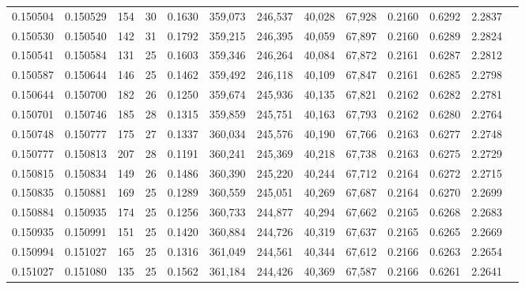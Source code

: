 \begin{tabular}{rrrrrrrrrrrrr}
0.150504 & 0.150529 & 154 &  30 &                                     0.1630 & 359,073 & 246,537 &  40,028 &  67,928 & 0.2160 & 0.6292 & 2.2837 \\
0.150530 & 0.150540 & 142 &  31 &                                     0.1792 & 359,215 & 246,395 &  40,059 &  67,897 & 0.2160 & 0.6289 & 2.2824 \\
0.150541 & 0.150584 & 131 &  25 &                                     0.1603 & 359,346 & 246,264 &  40,084 &  67,872 & 0.2161 & 0.6287 & 2.2812 \\
0.150587 & 0.150644 & 146 &  25 &                                     0.1462 & 359,492 & 246,118 &  40,109 &  67,847 & 0.2161 & 0.6285 & 2.2798 \\
0.150644 & 0.150700 & 182 &  26 &                                     0.1250 & 359,674 & 245,936 &  40,135 &  67,821 & 0.2162 & 0.6282 & 2.2781 \\
0.150701 & 0.150746 & 185 &  28 &                                     0.1315 & 359,859 & 245,751 &  40,163 &  67,793 & 0.2162 & 0.6280 & 2.2764 \\
0.150748 & 0.150777 & 175 &  27 &                                     0.1337 & 360,034 & 245,576 &  40,190 &  67,766 & 0.2163 & 0.6277 & 2.2748 \\
0.150777 & 0.150813 & 207 &  28 &                                     0.1191 & 360,241 & 245,369 &  40,218 &  67,738 & 0.2163 & 0.6275 & 2.2729 \\
0.150815 & 0.150834 & 149 &  26 &                                     0.1486 & 360,390 & 245,220 &  40,244 &  67,712 & 0.2164 & 0.6272 & 2.2715 \\
0.150835 & 0.150881 & 169 &  25 &                                     0.1289 & 360,559 & 245,051 &  40,269 &  67,687 & 0.2164 & 0.6270 & 2.2699 \\
0.150884 & 0.150935 & 174 &  25 &                                     0.1256 & 360,733 & 244,877 &  40,294 &  67,662 & 0.2165 & 0.6268 & 2.2683 \\
0.150935 & 0.150991 & 151 &  25 &                                     0.1420 & 360,884 & 244,726 &  40,319 &  67,637 & 0.2165 & 0.6265 & 2.2669 \\
0.150994 & 0.151027 & 165 &  25 &                                     0.1316 & 361,049 & 244,561 &  40,344 &  67,612 & 0.2166 & 0.6263 & 2.2654 \\
0.151027 & 0.151080 & 135 &  25 &                                     0.1562 & 361,184 & 244,426 &  40,369 &  67,587 & 0.2166 & 0.6261 & 2.2641 \\

\end{tabular}
